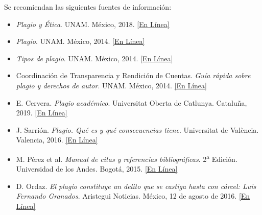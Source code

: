 \documentclass[letterpaper,10.5pt]{article}
\begin{document}
\bigskip\noindent
Se recomiendan las siguientes fuentes de información:
\begin{itemize}[noitemsep]

	\item \textit{Plagio y Ética}. UNAM. México, 2018. %
		\href{http://www.libros.unam.mx/plagioyetica.pdf}{[En Línea]}

	\item \textit{Plagio}. UNAM. México, 2014. %
		\href{http://www.eticaacademica.unam.mx/Plagio.html}{[En Línea]}

	\item \textit{Tipos de plagio}. UNAM. México, 2014. %
		\href{http://www.eticaacademica.unam.mx/Tipos_de_plagio.html}{[En Línea]}

	\item Coordinación de Transparencia y Rendición de Cuentas. \textit{Guía rápida sobre plagio y derechos de autor}. UNAM. México, 2014. %
		\href{https://www.derecho.unam.mx/integridad-academica/pdf/guia-plagio-derecho-autor.pdf}{[En Línea]}

	\item E. Cervera. \textit{Plagio académico}. Universitat Oberta de Catlunya. Cataluña, 2019.
		\href{http://biblioteca.uoc.edu/es/recursos/plagio-academico}{[En Línea]}

	\item J. Sarrión. \textit{Plagio. Qué es y qué consecuencias tiene}. Universitat de València. Valencia, 2016.
		\href{https://www.researchgate.net/publication/302261122_Plagio_Que_es_y_que_consecuencias_tiene}{[En Línea]}

	\item M. Pérez et al. \textit{Manual de citas y referencias bibliográficas}. 2\textsuperscript{a} Edición. Universidad de los Andes. Bogotá, 2015.
		\href{https://drive.google.com/file/d/11hlh4eQ28i9fXg-yOKV-OlYDyWSkiy6t/view?usp=sharing}{[En Línea]}

	\item D. Ordaz. \textit{El plagio constituye un delito que se castiga hasta con cárcel: Luis Fernando Granados}. Aristegui Noticias. México, 12 de agosto de 2016.
		\href{https://aristeguinoticias.com/2908/mexico/el-plagio-constituye-un-delito-que-se-castiga-hasta-con-carcel-luis-fernando-granados/}{[En Línea]}
\end{itemize}
\end{document}
